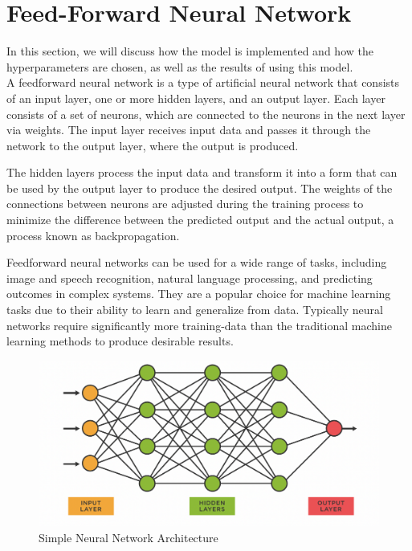 \section{Feed-Forward Neural Network}
In this section, we will discuss how the  model is implemented and how the hyperparameters are chosen, as well as the results of using this model.\\

A feedforward neural network is a type of artificial neural network that consists of an input layer, one or more hidden layers, and an output layer.
Each layer consists of a set of neurons, which are connected to the neurons in the next layer via weights.
The input layer receives input data and passes it through the network to the output layer, where the output is produced.

The hidden layers process the input data and transform it into a form that can be used by the output layer to produce the desired output.
The weights of the connections between neurons are adjusted during the training process to minimize the difference between the predicted output and the actual output, a process known as backpropagation.

Feedforward neural networks can be used for a wide range of tasks, including image and speech recognition, natural language processing, and predicting outcomes in complex systems.
They are a popular choice for machine learning tasks due to their ability to learn and generalize from data.
Typically neural networks require significantly more training-data than the traditional machine learning methods to produce desirable results.
\\

\begin{figure}[H]
    \centering
    \includegraphics[scale=0.3]{figures_for_report/simple_neural_network}
    \captionsetup{justification=centering,margin=2cm}
    \caption{Simple Neural Network Architecture}
\end{figure}



